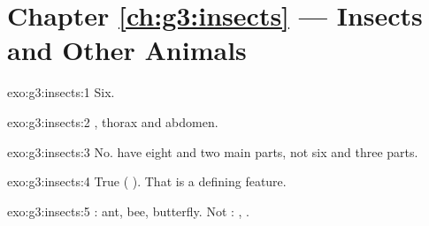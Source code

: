 \section*{Chapter \ref{ch:g3:insects} --- Insects and Other Animals}

\begin{solution}{exo:g3:insects:1}
Six.
\end{solution}

\begin{solution}{exo:g3:insects:2}
, thorax and abdomen.
\end{solution}

\begin{solution}{exo:g3:insects:3}
No.  have eight  and two main  parts, not six 
and three parts.
\end{solution}

\begin{solution}{exo:g3:insects:4}
True ( ). That is a defining feature.
\end{solution}

\begin{solution}{exo:g3:insects:5}
: ant, bee, butterfly. Not : , .
\end{solution}

